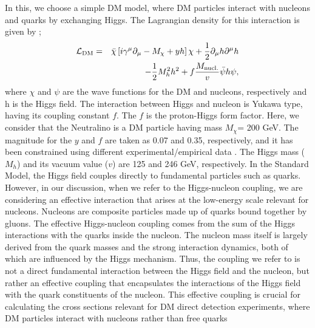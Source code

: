In this, we choose a simple DM model, where DM particles interact with nucleons and quarks by exchanging Higgs. The Lagrangian density for this interaction is given by \cite{DM1,DM2,DM3,ankit2024};
\begin{eqnarray}
	{\cal{L}}_{\rm DM} & = & \bar \chi \left[ i \gamma^\mu \partial_\mu - M_\chi + y h \right] \chi +  \frac{1}{2}\partial_\mu h \partial^\mu h  \nonumber\\
	& &
	- \frac{1}{2} M_h^2 h^2 + f \frac{M_{\rm nucl.}}{v} \bar \psi h \psi , 
	\label{eq:LDM}
\end{eqnarray}
where $\chi$ and $\psi$ are the wave functions for the DM and nucleons, respectively and h is the Higgs field. The interaction between Higgs and nucleon is Yukawa type, having its coupling constant $f$. The $f$ is the proton-Higgs form factor. Here, we consider that the Neutralino is a DM particle having mass $M_\chi$= 200 GeV. The magnitude for the $y$ and $f$ are taken as 0.07 and 0.35, respectively, and it has been constrained using different experimental/empirical data \cite{DM5}. The Higgs mass ($M_h$) and its vacuum value ($v$) are 125 and 246 GeV, respectively. 
{In the Standard Model, the Higgs field couples directly to fundamental particles such as quarks. However, in our discussion, when we refer to the Higgs-nucleon coupling, we are considering an effective interaction that arises at the low-energy scale relevant for nucleons. Nucleons are composite particles made up of quarks bound together by gluons. The effective Higgs-nucleon coupling comes from the sum of the Higgs interactions with the quarks inside the nucleon. The nucleon mass itself is largely derived from the quark masses and the strong interaction dynamics, both of which are influenced by the Higgs mechanism. Thus, the coupling we refer to is not a direct fundamental interaction between the Higgs field and the nucleon, but rather an effective coupling that encapsulates the interactions of the Higgs field with the quark constituents of the nucleon. This effective coupling is crucial for calculating the cross sections relevant for DM direct detection experiments, where DM particles interact with nucleons rather than free quarks \cite{PhysRevD.96.083004}}

